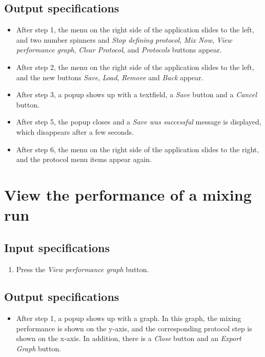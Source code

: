 \subsection*{Output specifications}
\begin{itemize}
\item After step 1, the menu on the right side of the application slides to the left, and two number spinners and \emph{Stop defining protocol}, \emph{Mix Now}, \emph{View performance graph}, \emph{Clear Protocol}, and \emph{Protocols} buttons appear.
\item After step 2, the menu on the right side of the application slides to the left, and the new buttons \emph{Save}, \emph{Load}, \emph{Remove} and \emph{Back} appear.
\item After step 3, a popup shows up with a textfield, a \emph{Save} button and a \emph{Cancel} button.
\item After step 5, the popup closes and a \emph{Save was successful} message is displayed, which disappears after a few seconds.
\item After step 6, the menu on the right side of the application slides to the right, and the protocol menu items appear again.
\end{itemize}

\section{View the performance of a mixing run}

\subsection*{Input specifications}
\begin{enumerate}
\item Press the \emph{View performance graph} button.
\end{enumerate}

\subsection*{Output specifications}
\begin{itemize}
\item After step 1, a popup shows up with a graph. In this graph, the mixing performance is shown on the y-axis, and the corresponding protocol step is shown on the x-axis. In addition, there is a \emph{Close} button and an \emph{Export Graph} button.
\end{itemize}

